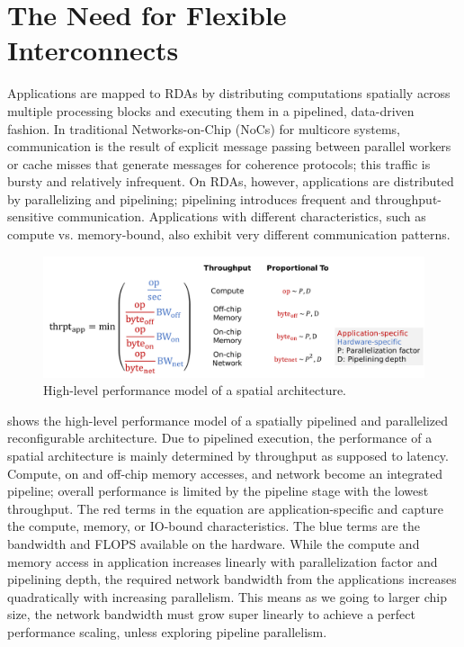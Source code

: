 \section{The Need for Flexible Interconnects}
Applications are mapped to RDAs by distributing computations spatially across multiple processing
blocks and executing them in a pipelined, data-driven fashion.
In traditional Networks-on-Chip
(NoCs) for multicore systems, communication is the result of explicit message passing between
parallel workers or cache misses that generate messages for coherence protocols; this traffic is bursty and
relatively infrequent.
On RDAs, however, applications are distributed by parallelizing and pipelining;
pipelining introduces frequent and throughput-sensitive communication.
Applications with different characteristics, such as compute vs. memory-bound, also exhibit
very different communication patterns.

\begin{figure}
\centering
\includegraphics[width=1\textwidth]{figs/perfmodel.pdf}
\caption[High-level performance model of a spatial architecture]{
High-level performance model of a spatial architecture.
}
\label{fig:perfmodel}
\end{figure}

 shows the high-level performance model of a spatially pipelined and parallelized
reconfigurable architecture.
Due to pipelined execution, the performance of a spatial architecture is mainly determined by throughput as
supposed to latency.
Compute, on and off-chip memory accesses, and network become an integrated pipeline;
overall performance is limited by the pipeline stage with the lowest throughput.
The red terms in the equation are application-specific and capture the compute, memory, or IO-bound characteristics.
The blue terms are the bandwidth and FLOPS available on the hardware.
While the compute and memory access in application increases linearly with parallelization factor and pipelining depth,
the required network bandwidth from the applications increases quadratically with increasing parallelism.
This means as we going to larger chip size, the network bandwidth must grow super linearly to achieve a perfect performance scaling, unless exploring pipeline parallelism.

